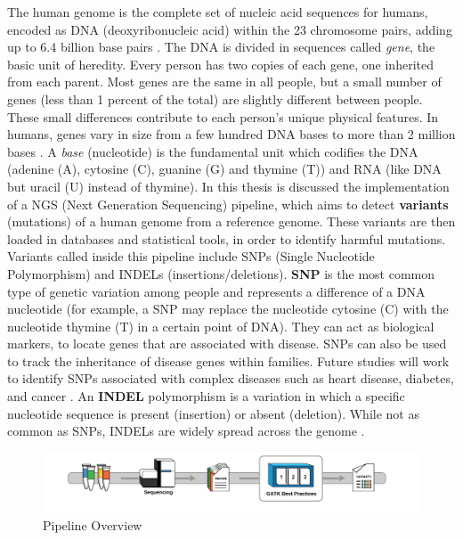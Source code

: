 The human genome is the complete set of nucleic acid sequences for humans, encoded as DNA (deoxyribonucleic acid) within the 23 chromosome pairs, adding up to 6.4 billion base pairs \cite{WIKI:HumanGenome}. The DNA is divided in sequences called \textit{gene}, the basic unit of heredity. Every person has two copies of each gene, one inherited from each parent. Most genes are the same in all people, but a small number of genes (less than 1 percent of the total) are slightly different between people. These small differences contribute to each person's unique physical features. In humans, genes vary in size from a few hundred DNA bases to more than 2 million bases \cite{Gene}. A \textit{base} (nucleotide) is the fundamental unit which codifies the DNA (adenine (A), cytosine (C), guanine (G) and thymine (T)) and RNA (like DNA but uracil (U) instead of thymine).\newline
In this thesis is discussed the implementation of a NGS (Next Generation Sequencing) pipeline, which aims to detect \textbf{variants} (mutations) of a human genome from a reference genome. These variants are then loaded in databases and statistical tools, in order to identify harmful mutations. Variants called inside this pipeline include SNPs (Single Nucleotide Polymorphism) and INDELs (insertions/deletions).\newline
\textbf{SNP} is the most common type of genetic variation among people and represents a difference of a DNA nucleotide (for example, a SNP may replace the nucleotide cytosine (C) with the nucleotide thymine (T) in a certain point of DNA). They can act as biological markers, to locate genes that are associated with disease. SNPs can also be used to track the inheritance of disease genes within families. Future studies will work to identify SNPs associated with complex diseases such as heart disease, diabetes, and cancer \cite{SNP}.\newline
An \textbf{INDEL} polymorphism is a variation in which a specific nucleotide sequence is present (insertion) or absent (deletion). While not as common as SNPs, INDELs are widely spread across the genome \cite{INDEL}.
\begin{figure}[h] 
\begin{center}
\includegraphics[scale=0.51]{figure/pipeline_overview.png}
\end{center}
\caption{Pipeline Overview ~\label{pipeline_overview}}
\end{figure}

